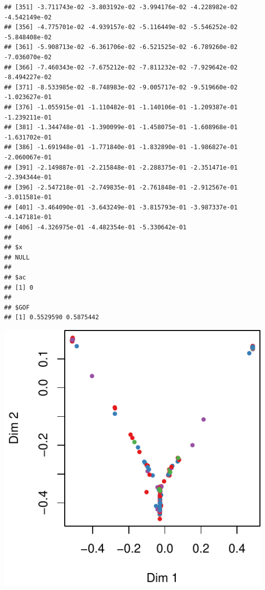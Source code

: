 \documentclass[]{article}
\newenvironment{Shaded}{\begin{snugshade}}{\end{snugshade}}
\newcommand{\DataTypeTok}[1]{\textcolor[rgb]{0.13,0.29,0.53}{#1}}
\newcommand{\DecValTok}[1]{\textcolor[rgb]{0.00,0.00,0.81}{#1}}
\newcommand{\KeywordTok}[1]{\textcolor[rgb]{0.13,0.29,0.53}{\textbf{#1}}}
\newcommand{\NormalTok}[1]{#1}
\newcommand{\OperatorTok}[1]{\textcolor[rgb]{0.81,0.36,0.00}{\textbf{#1}}}
\begin{document}
\begin{verbatim}
## [351] -3.711743e-02 -3.803192e-02 -3.994176e-02 -4.228982e-02 -4.542149e-02
## [356] -4.775701e-02 -4.939157e-02 -5.116449e-02 -5.546252e-02 -5.848408e-02
## [361] -5.908713e-02 -6.361706e-02 -6.521525e-02 -6.789260e-02 -7.036070e-02
## [366] -7.460343e-02 -7.675212e-02 -7.811232e-02 -7.929642e-02 -8.494227e-02
## [371] -8.533985e-02 -8.748983e-02 -9.005717e-02 -9.519660e-02 -1.023627e-01
## [376] -1.055915e-01 -1.110482e-01 -1.140106e-01 -1.209387e-01 -1.239211e-01
## [381] -1.344748e-01 -1.390099e-01 -1.458075e-01 -1.608968e-01 -1.631702e-01
## [386] -1.691948e-01 -1.771840e-01 -1.832890e-01 -1.986827e-01 -2.060067e-01
## [391] -2.149887e-01 -2.215848e-01 -2.288375e-01 -2.351471e-01 -2.394344e-01
## [396] -2.547218e-01 -2.749835e-01 -2.761848e-01 -2.912567e-01 -3.011581e-01
## [401] -3.464090e-01 -3.643249e-01 -3.815793e-01 -3.987337e-01 -4.147181e-01
## [406] -4.326975e-01 -4.482354e-01 -5.330642e-01
## 
## $x
## NULL
## 
## $ac
## [1] 0
## 
## $GOF
## [1] 0.5529590 0.5875442
\end{verbatim}

\begin{Shaded}
\end{Shaded}

\includegraphics{markdown_v50_files/figure-latex/unnamed-chunk-107-2.pdf}
\end{document}
